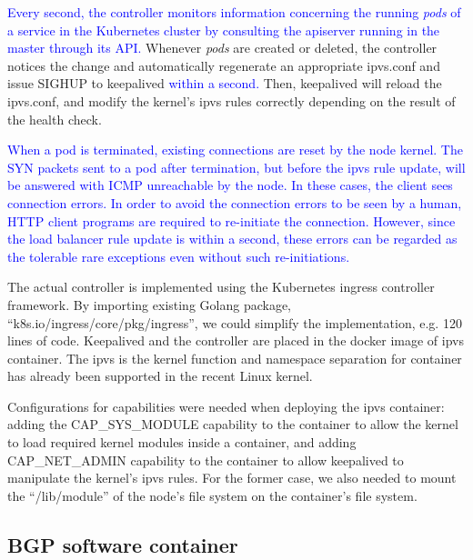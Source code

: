 \textcolor{blue}{
Every second, the controller monitors information concerning the running {\em pods} of a service in the Kubernetes cluster by consulting the apiserver running in the master through its API.
}
Whenever {\em pods} are created or deleted, the controller notices the change and automatically regenerate an appropriate ipvs.conf 
and issue SIGHUP to keepalived \textcolor{blue}{
within a second.}
Then, keepalived will reload the ipvs.conf, and modify the kernel's ipvs rules correctly depending on the result of the health check.

\textcolor{blue}{
When a pod is terminated, existing connections are reset by the node kernel.
The SYN packets sent to a pod after termination, but before the ipvs rule update, will be answered with ICMP unreachable by the node.
In these cases, the client sees connection errors.
In order to avoid the connection errors to be seen by a human, HTTP client programs are required to re-initiate the connection.
However, since the load balancer rule update is within a second, these errors can be regarded as the tolerable rare exceptions even without such re-initiations.
}

The actual controller\cite{ktaka_ccmp_2017_826894} is implemented using the Kubernetes ingress controller\cite{K8sIngress2017} framework. 
By importing existing Golang package, \enquote{k8s.io/ingress/core/pkg/ingress}, we could simplify the implementation, e.g. 
120 lines of code.  
%
Keepalived and the controller are placed in the docker image of ipvs container.
The ipvs is the kernel function and namespace separation for container has already been supported in the recent Linux kernel. 

Configurations for capabilities were needed when deploying the ipvs container: adding the CAP\_SYS\_MODULE capability 
to the container to allow the kernel to load required kernel modules inside a container, 
and adding CAP\_NET\_ADMIN capability to the container to allow keepalived to manipulate the kernel's ipvs rules. 
For the former case, we also needed to mount the \enquote{/lib/module} of the node's file system on the container's file system.

\subsection{BGP software container}

